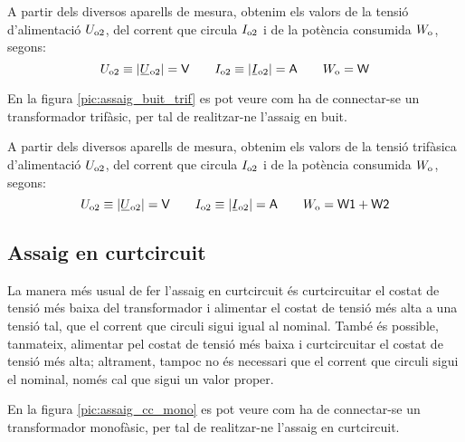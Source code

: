 A partir dels diversos aparells de mesura, obtenim els valors de la
tensió d'alimentació $U_\mathrm{o2}$, del corrent que circula
$I_\mathrm{o2}$ i de la potència consumida $W_\mathrm{o}$, segons:
\begin{equation}
    U\ped{o2}\equiv|\cmplx{U}\ped{o2}|=\textsf{V} \qquad
    I\ped{o2}\equiv|\cmplx{I}\ped{o2}|=\textsf{A}
    \qquad W\ped{o}=\textsf{W}
\end{equation}

En la figura \vref{pic:assaig_buit_trif} es pot veure com ha de
connectar-se un transformador trifàsic, per tal de realitzar-ne l'assaig en buit.

\begin{center}
    
    \label{pic:assaig_buit_trif}
\end{center}


A partir dels diversos aparells de mesura, obtenim els valors de la
tensió trifàsica d'alimentació $U_\mathrm{o2}$, del corrent que circula
$I_\mathrm{o2}$ i de la potència consumida $W_\mathrm{o}$, segons:
\begin{equation}
    U\ped{o2}\equiv|\cmplx{U}\ped{o2}|=\textsf{V} \qquad
    I\ped{o2}\equiv|\cmplx{I}\ped{o2}|=\textsf{A} \qquad
    W\ped{o}=\textsf{W1}+\textsf{W2}
\end{equation}

\subsection{Assaig en curtcircuit}

La manera més usual de fer l'assaig en curtcircuit és
curtcircuitar el costat de tensió més baixa del transformador i
alimentar el costat de tensió més alta a  una tensió tal, que el corrent
que circuli sigui igual al nominal. També és possible, tanmateix,
alimentar pel costat de  tensió més baixa i curtcircuitar el costat de
 tensió més alta; altrament, tampoc no és necessari que el corrent
que circuli sigui el nominal, només cal que sigui un valor proper.

En la figura \vref{pic:assaig_cc_mono} es pot veure com ha de
connectar-se un transformador monofàsic, per tal de realitzar-ne l'assaig en curtcircuit.


\begin{center}
    
    \label{pic:assaig_cc_mono} \
\end{center}

